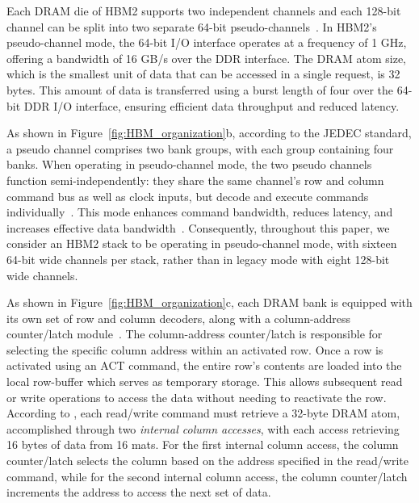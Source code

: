 Each DRAM die of HBM2 supports two independent channels and each 128-bit channel can be split into two separate 64-bit pseudo-channels~\cite{psch_mode}. In HBM2's pseudo-channel mode, the 64-bit I/O interface operates at a frequency of 1 GHz, offering a bandwidth of 16 GB/s over the DDR interface. The DRAM atom size, which is the smallest unit of data that can be accessed in a single request, is 32 bytes. This amount of data is transferred using a burst length of four over the 64-bit DDR I/O interface, ensuring efficient data throughput and reduced latency.

As shown in Figure~\ref{fig:HBM_organization}b, according to the JEDEC standard, a pseudo channel comprises two bank groups, with each group containing four banks. When operating in pseudo-channel mode, the two pseudo channels function semi-independently: they share the same channel’s row and column command bus as well as clock inputs, but decode and execute commands individually~\cite{jedec}. This mode enhances command bandwidth, reduces latency, and increases effective data bandwidth~\cite{demystifyingHBM}. Consequently, throughout this paper, we consider an HBM2 stack to be operating in pseudo-channel mode, with sixteen 64-bit wide channels per stack, rather than in legacy mode with eight 128-bit wide channels.

As shown in Figure~\ref{fig:HBM_organization}c, each DRAM bank is equipped with its own set of row and column decoders, along with a column-address counter/latch module~\cite{micron_ddr4}. The column-address counter/latch is responsible for selecting the specific column address within an activated row. Once a row is activated using an ACT command, the entire row's contents are loaded into the local row-buffer which serves as temporary storage. This allows subsequent read or write operations to access the data without needing to reactivate the row. According to \cite{fine-grained}, each read/write command must retrieve a 32-byte DRAM atom, accomplished through two \textit{internal column accesses}, with each access retrieving 16 bytes of data from 16 mats. For the first internal column access, the column counter/latch selects the column based on the address specified in the read/write command, while for the second internal column access, the column counter/latch increments the address to access the next set of data.


